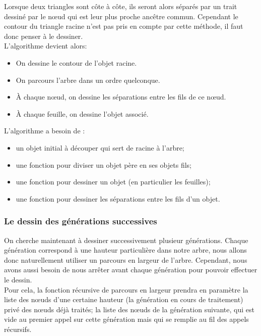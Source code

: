 \documentclass[a4paper,11pt]{article}
\begin{document}
Lorsque deux triangles sont côte à côte, ils seront alors séparés par un trait dessiné
par le nœud qui est leur plus proche ancêtre commun. Cependant le contour du triangle racine
n'est pas pris en compte par cette méthode, il faut donc penser à le dessiner.\\

L'algorithme devient alors:
\begin{itemize}
  \item On dessine le contour de l'objet racine.
  \item On parcours l'arbre dans un ordre quelconque.
  \item À chaque nœud, on dessine les séparations entre les fils de ce nœud.
  \item À chaque feuille, on dessine l'objet associé.\\
\end{itemize}

L'algorithme a besoin de :
\begin{itemize}
  \item un objet initial à découper qui sert de racine à l'arbre;
  \item une fonction pour diviser un objet père en ses objets fils;
  \item une fonction pour dessiner un objet (en particulier les feuilles);
  \item une fonction pour dessiner les séparations entre les fils d'un objet.
\end{itemize}

\subsubsection{Le dessin des générations successives}
On cherche maintenant à dessiner successivement plusieur générations. Chaque génération
correspond à une hauteur particulière dans notre arbre, nous allons donc naturellement
utiliser un parcours en largeur de l'arbre. Cependant, nous avons aussi besoin de nous
arrêter avant chaque génération pour pouvoir effectuer le dessin.\\

Pour cela, la fonction récursive de parcours en largeur prendra en paramètre la liste des
nœuds d'une certaine hauteur (la génération en cours de traitement) privé des nœuds déjà
traités; la liste des nœuds de la génération suivante, qui est vide au premier appel sur
cette génération mais qui se remplie au fil des appels récursifs.\\
\end{document}
